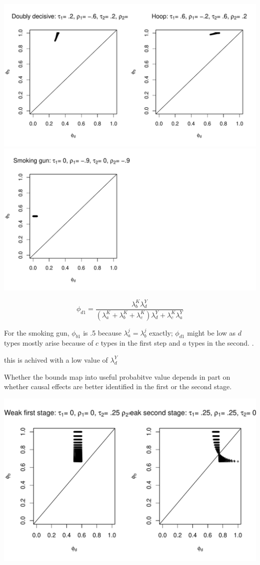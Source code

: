\documentclass[12pt,]{book}
\begin{document}
\includegraphics{ii_files/figure-latex/unnamed-chunk-88-1.pdf} \includegraphics{ii_files/figure-latex/unnamed-chunk-88-2.pdf}

\[\phi_{d1} = \frac{\lambda_{b}^K\lambda_{d}^Y}{(\lambda_{a}^K + \lambda_{b}^K + \lambda_{c}^K)\lambda_{d}^Y+ \lambda_{c}^K\lambda_{a}^Y}\]

For the smoking gun, \(\phi_{b1}\) is .5 because \(\lambda_a^j = \lambda_b^j\) exactly; \(\phi_{d1}\) might be low as \(d\) types mostly arise because of \(c\) types in the first step and \(a\) types in the second.
.

this is achived with a low value of \(\lambda_{d}^Y\)

Whether the bounds map into useful probabitve value depends in part on whether causal effects are better identified in the first or the second stage.

\includegraphics{ii_files/figure-latex/unnamed-chunk-90-1.pdf}
\end{document}
